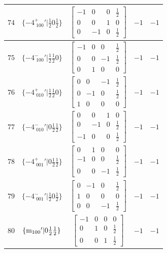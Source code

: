 \documentclass[fleqn,8pt]{jsarticle}
\begin{document}
\begin{longtable}{ccccc}
$ 74 $ & $ \{-4^{+}_{\,\,100}{}'|\frac{1}{2} 0 \frac{1}{2}\} $ & $ \begin{bmatrix} -1 & 0 & 0 & \frac{1}{2} \\ 0 & 0 & 1 & 0 \\ 0 & -1 & 0 & \frac{1}{2} \end{bmatrix} $ & $ -1 $ & $ -1 $ \\ \hline
$ 75 $ & $ \{-4^{-}_{\,\,100}{}'|\frac{1}{2} \frac{1}{2} 0\} $ & $ \begin{bmatrix} -1 & 0 & 0 & \frac{1}{2} \\ 0 & 0 & -1 & \frac{1}{2} \\ 0 & 1 & 0 & 0 \end{bmatrix} $ & $ -1 $ & $ -1 $ \\ \hline
$ 76 $ & $ \{-4^{+}_{\,\,010}{}'|\frac{1}{2} \frac{1}{2} 0\} $ & $ \begin{bmatrix} 0 & 0 & -1 & \frac{1}{2} \\ 0 & -1 & 0 & \frac{1}{2} \\ 1 & 0 & 0 & 0 \end{bmatrix} $ & $ -1 $ & $ -1 $ \\ \hline
$ 77 $ & $ \{-4^{-}_{\,\,010}{}'|0 \frac{1}{2} \frac{1}{2}\} $ & $ \begin{bmatrix} 0 & 0 & 1 & 0 \\ 0 & -1 & 0 & \frac{1}{2} \\ -1 & 0 & 0 & \frac{1}{2} \end{bmatrix} $ & $ -1 $ & $ -1 $ \\ \hline
$ 78 $ & $ \{-4^{+}_{\,\,001}{}'|0 \frac{1}{2} \frac{1}{2}\} $ & $ \begin{bmatrix} 0 & 1 & 0 & 0 \\ -1 & 0 & 0 & \frac{1}{2} \\ 0 & 0 & -1 & \frac{1}{2} \end{bmatrix} $ & $ -1 $ & $ -1 $ \\ \hline
$ 79 $ & $ \{-4^{-}_{\,\,001}{}'|\frac{1}{2} 0 \frac{1}{2}\} $ & $ \begin{bmatrix} 0 & -1 & 0 & \frac{1}{2} \\ 1 & 0 & 0 & 0 \\ 0 & 0 & -1 & \frac{1}{2} \end{bmatrix} $ & $ -1 $ & $ -1 $ \\ \hline
$ 80 $ & $ \{{\rm m}_{100}{}'|0 \frac{1}{2} \frac{1}{2}\} $ & $ \begin{bmatrix} -1 & 0 & 0 & 0 \\ 0 & 1 & 0 & \frac{1}{2} \\ 0 & 0 & 1 & \frac{1}{2} \end{bmatrix} $ & $ -1 $ & $ -1 $ \\ \hline

\end{longtable}
\end{document}
